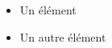 \documentclass{article}
\begin{document}
\begin{itemize}
  \item Un élément
  \item Un autre élément
\end{itemize}
\end{document}
